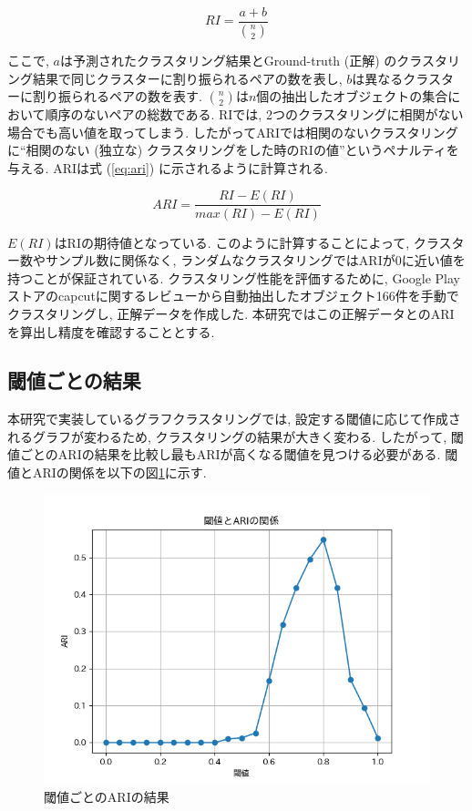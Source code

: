 \begin{equation}
  \label{eq:ri}
  RI = \frac{a+b}{\binom{n}{2}}
\end{equation}

ここで, \(a\)は予測されたクラスタリング結果とGround-truth (正解) のクラスタリング結果で同じクラスターに割り振られるペアの数を表し, \(b\)は異なるクラスターに割り振られるペアの数を表す. \(\binom{n}{2}\)は\(n\)個の抽出したオブジェクトの集合において順序のないペアの総数である. 
RIでは, 2つのクラスタリングに相関がない場合でも高い値を取ってしまう. したがってARIでは相関のないクラスタリングに``相関のない (独立な) クラスタリングをした時のRIの値''というペナルティを与える. ARIは式 (\ref{eq:ari}) に示されるように計算される. 

\begin{equation}
  \label{eq:ari}
  ARI = \frac{RI-E (RI) }{max (RI) -E (RI) }
\end{equation}

\(E(RI)\)はRIの期待値となっている. このように計算することによって, クラスター数やサンプル数に関係なく, ランダムなクラスタリングではARIが0に近い値を持つことが保証されている. 
クラスタリング性能を評価するために, Google Playストアのcapcutに関するレビューから自動抽出したオブジェクト166件を手動でクラスタリングし, 正解データを作成した. 本研究ではこの正解データとのARIを算出し精度を確認することとする. 

\subsection{閾値ごとの結果}
本研究で実装しているグラフクラスタリングでは, 設定する閾値に応じて作成されるグラフが変わるため, クラスタリングの結果が大きく変わる. したがって, 閾値ごとのARIの結果を比較し最もARIが高くなる閾値を見つける必要がある. 
閾値とARIの関係を以下の図\ref{fig:cw_graph}に示す.

\begin{figure}[H]
  \centering
  \includegraphics[scale=0.8]
    {contents/images/cw_graph.png}
  \caption{閾値ごとのARIの結果\label{fig:cw_graph}}
\end{figure}

